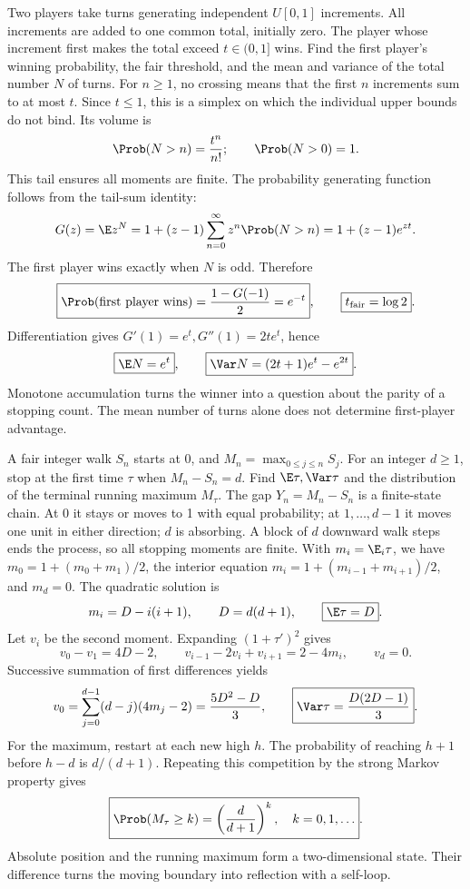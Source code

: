 Two players take turns generating independent $U[0,1]$ increments. All increments are added to one common total, initially zero. The player whose increment first makes the total exceed $t\in(0,1]$ wins. Find the first player's winning probability, the fair threshold, and the mean and variance of the total number $N$ of turns.
\solution For $n\ge1$, no crossing means that the first $n$ increments sum to at most $t$. Since $t\le1$, this is a simplex on which the individual upper bounds do not bind. Its volume is
\[
 \Prob(N>n)=\frac{t^n}{n!};\qquad \Prob(N>0)=1.
\]
This tail ensures all moments are finite. The probability generating function follows from the tail-sum identity:
\[
 G(z)=\E z^N=1+(z-1)\sum_{n=0}^\infty z^n\Prob(N>n)
 =1+(z-1)e^{zt}.
\]
The first player wins exactly when $N$ is odd. Therefore
\[
 \boxed{\Prob(\text{first player wins})=\frac{1-G(-1)}2=e^{-t}},\qquad
 \boxed{t_{\rm fair}=\log2}.
\]
Differentiation gives $G'(1)=e^t,G''(1)=2te^t$, hence
\[
 \boxed{\E N=e^t},\qquad
 \boxed{\Var N=(2t+1)e^t-e^{2t}}.
\]
\insight Monotone accumulation turns the winner into a question about the parity of a stopping count. The mean number of turns alone does not determine first-player advantage.

A fair integer walk $S_n$ starts at 0, and $M_n=\max_{0\le j\le n}S_j$. For an integer $d\ge1$, stop at the first time $\tau$ when $M_n-S_n=d$. Find $\E\tau,\Var\tau$ and the distribution of the terminal running maximum $M_\tau$.
\solution The gap $Y_n=M_n-S_n$ is a finite-state chain. At 0 it stays or moves to 1 with equal probability; at $1,\ldots,d-1$ it moves one unit in either direction; $d$ is absorbing. A block of $d$ downward walk steps ends the process, so all stopping moments are finite. With $m_i=\E_i\tau$, we have $m_0=1+(m_0+m_1)/2$, the interior equation $m_i=1+(m_{i-1}+m_{i+1})/2$, and $m_d=0$. The quadratic solution is
\[
 m_i=D-i(i+1),\qquad D=d(d+1),\qquad \boxed{\E\tau=D}.
\]
Let $v_i$ be the second moment. Expanding $(1+\tau')^2$ gives
\[
 v_0-v_1=4D-2,\qquad
 v_{i-1}-2v_i+v_{i+1}=2-4m_i,\qquad v_d=0.
\]
Successive summation of first differences yields
\[
 v_0=\sum_{j=0}^{d-1}(d-j)(4m_j-2)=\frac{5D^2-D}{3},
 \qquad \boxed{\Var\tau=\frac{D(2D-1)}3}.
\]
For the maximum, restart at each new high $h$. The probability of reaching $h+1$ before $h-d$ is $d/(d+1)$. Repeating this competition by the strong Markov property gives
\[
 \boxed{\Prob(M_\tau\ge k)=\left(\frac d{d+1}\right)^k,
 \quad k=0,1,\ldots}.
\]
\insight Absolute position and the running maximum form a two-dimensional state. Their difference turns the moving boundary into reflection with a self-loop.

